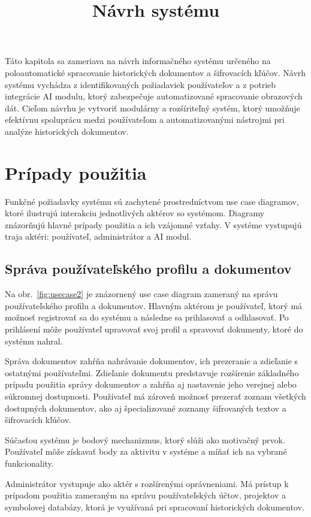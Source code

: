 \documentclass[12pt,a4paper]{article}
\title{Návrh systému}
\author{}
\date{}
\begin{document}
\maketitle
Táto kapitola sa zameriava na návrh informačného systému určeného na poloautomatické spracovanie historických dokumentov a šifrovacích kľúčov. Návrh systému vychádza z identifikovaných požiadaviek používateľov a z potrieb integrácie AI modulu, ktorý zabezpečuje automatizované spracovanie obrazových dát. Cieľom návrhu je vytvoriť modulárny a rozšíriteľný systém, ktorý umožňuje efektívnu spoluprácu medzi používateľom a automatizovanými nástrojmi pri analýze historických dokumentov.

\section{Prípady použitia}

Funkčné požiadavky systému sú zachytené prostredníctvom use case diagramov, ktoré ilustrujú interakciu jednotlivých aktérov so systémom. Diagramy znázorňujú hlavné prípady použitia a ich vzájomné vzťahy. V systéme vystupujú traja aktéri: používateľ, administrátor a AI modul.

\subsection{Správa používateľského profilu a dokumentov}

Na obr.~\ref{fig:usecase2} je znázornený use case diagram zameraný na správu používateľského profilu a dokumentov. Hlavným aktérom je používateľ, ktorý má možnosť registrovať sa do systému a následne sa prihlasovať a odhlasovať. Po prihlásení môže používateľ upravovať svoj profil a spravovať dokumenty, ktoré do systému nahral.

Správa dokumentov zahŕňa nahrávanie dokumentov, ich prezeranie a zdieľanie s ostatnými používateľmi. Zdieľanie dokumentu predstavuje rozšírenie základného prípadu použitia správy dokumentov a zahŕňa aj nastavenie jeho verejnej alebo súkromnej dostupnosti. Používateľ má zároveň možnosť prezerať zoznam všetkých dostupných dokumentov, ako aj špecializované zoznamy šifrovaných textov a šifrovacích kľúčov.

Súčasťou systému je bodový mechanizmus, ktorý slúži ako motivačný prvok. Používateľ môže získavať body za aktivitu v systéme a míňať ich na vybrané funkcionality.

Administrátor vystupuje ako aktér s rozšírenými oprávneniami. Má prístup k prípadom použitia zameraným na správu používateľských účtov, projektov a symbolovej databázy, ktorá je využívaná pri spracovaní historických dokumentov.
\end{document}

